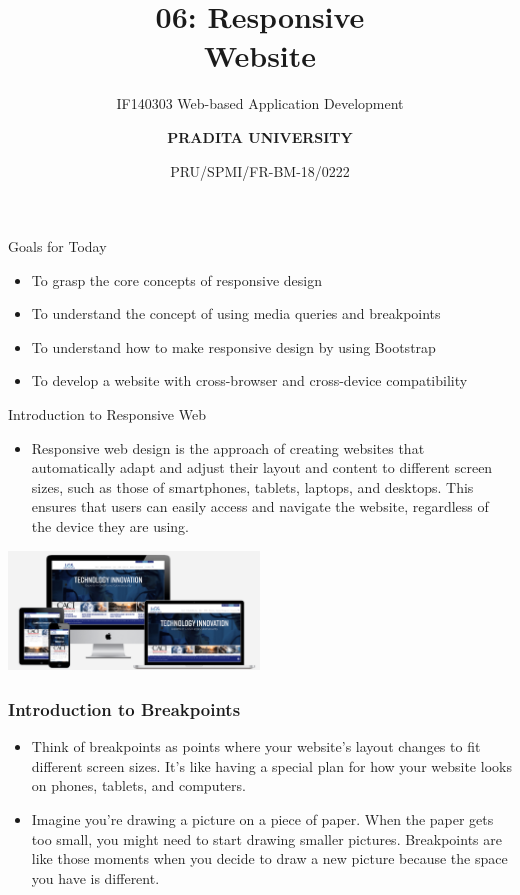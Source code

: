 \documentclass[aspectratio=169, table]{beamer}
\subtitle{IF140303 Web-based Application Development}
\title{\huge {\textbf{06: Responsive\\Website}}}
\date[Serial]{\scriptsize {PRU/SPMI/FR-BM-18/0222}}
\author[Pradita]{\small {\textbf{PRADITA UNIVERSITY}}}
\begin{document}
\begin{frame}
    \titlepage
\end{frame}

\begin{frame}{Goals for Today}
    \vskip-1cm
    \begin{itemize}
        \item To grasp the core concepts of responsive design
        \item To understand the concept of using media queries and breakpoints
        \item To understand how to make responsive design by using Bootstrap 
        \item To develop a website with cross-browser and cross-device compatibility
    \end{itemize}
\end{frame}

\begin{frame}{Introduction to Responsive Web}
    \vskip1cm
    \begin{itemize}
        \item Responsive web design is the approach of creating websites that automatically adapt and adjust their layout and content to different screen sizes, such as those of smartphones, tablets, laptops, and desktops. This ensures that users can easily access and navigate the website, regardless of the device they are using.
    \end{itemize}
    \begin{center}
	\includegraphics[width=0.5\textwidth]{classFiles/responsive-web.png}
    \end{center}
\end{frame}

\begin{frame}[fragile]
	\frametitle{Introduction to Breakpoints}
	\vskip0cm
	 \begin{itemize}
        \item Think of breakpoints as points where your website's layout changes to fit different screen sizes. It's like having a special plan for how your website looks on phones, tablets, and computers.
	\item Imagine you're drawing a picture on a piece of paper. When the paper gets too small, you might need to start drawing smaller pictures. Breakpoints are like those moments when you decide to draw a new picture because the space you have is different.
   	 \end{itemize}
\end{frame}
\end{document}
